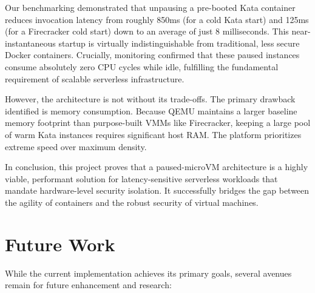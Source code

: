 \documentclass[12pt,a4paper]{report}
\begin{document}
Our benchmarking demonstrated that unpausing a pre-booted Kata container reduces invocation latency from roughly 850ms (for a cold Kata start) and 125ms (for a Firecracker cold start) down to an average of just 8 milliseconds. This near-instantaneous startup is virtually indistinguishable from traditional, less secure Docker containers. Crucially, monitoring confirmed that these paused instances consume absolutely zero CPU cycles while idle, fulfilling the fundamental requirement of scalable serverless infrastructure.

However, the architecture is not without its trade-offs. The primary drawback identified is memory consumption. Because QEMU maintains a larger baseline memory footprint than purpose-built VMMs like Firecracker, keeping a large pool of warm Kata instances requires significant host RAM. The platform prioritizes extreme speed over maximum density.

In conclusion, this project proves that a paused-microVM architecture is a highly viable, performant solution for latency-sensitive serverless workloads that mandate hardware-level security isolation. It successfully bridges the gap between the agility of containers and the robust security of virtual machines.

\section{Future Work}
While the current implementation achieves its primary goals, several avenues remain for future enhancement and research:
\end{document}
